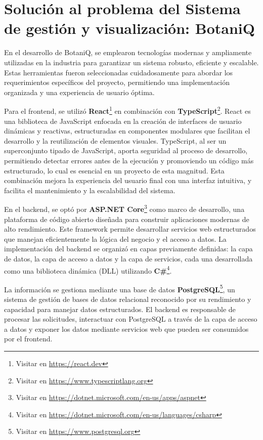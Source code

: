 \section{Solución al problema del Sistema de gestión y visualización: BotaniQ}
En el desarrollo de BotaniQ, se emplearon tecnologías modernas y ampliamente utilizadas en la industria 
para garantizar un sistema robusto, eficiente y escalable. Estas herramientas fueron seleccionadas 
cuidadosamente para abordar los requerimientos específicos del proyecto, permitiendo una implementación 
organizada y una experiencia de usuario óptima.

Para el frontend, se utilizó 
\textbf{React}\footnote{Visitar en \url{https://react.dev}}
en combinación con 
\textbf{TypeScript}\footnote{Visitar en \url{https://www.typescriptlang.org}}. 
React es una biblioteca de JavaScript enfocada en la creación de interfaces de usuario dinámicas y reactivas, estructuradas en componentes 
modulares que facilitan el desarrollo y la reutilización de elementos visuales. TypeScript, al ser un 
superconjunto tipado de JavaScript, aporta seguridad al proceso de desarrollo, permitiendo detectar 
errores antes de la ejecución y promoviendo un código más estructurado, lo cual es esencial en un 
proyecto de esta magnitud. Esta combinación mejora la experiencia del usuario final con una 
interfaz intuitiva, y facilita el mantenimiento y la escalabilidad del sistema.

En el backend, se optó por 
\textbf{ASP.NET Core}\footnote{Visitar en \url{https://dotnet.microsoft.com/en-us/apps/aspnet}}
como marco de desarrollo, una plataforma de código abierto diseñada para construir aplicaciones modernas 
de alto rendimiento. Este framework permite desarrollar servicios web estructurados que manejan eficientemente la lógica 
del negocio y el acceso a datos. 
La implementación del backend se organizó en capas previamente definidas: la capa de datos, la capa de acceso a datos y 
la capa de servicios, cada una desarrollada como una biblioteca dinámica (DLL) utilizando
\textbf{C\#}\footnote{Visitar en \url{https://dotnet.microsoft.com/en-us/languages/csharp}}.

La información se gestiona mediante una base de datos 
\textbf{PostgreSQL}\footnote{Visitar en \url{https://www.postgresql.org}}, 
un sistema de gestión de bases de datos relacional reconocido por su rendimiento y capacidad para manejar datos estructurados. 
El backend es responsable de procesar las solicitudes, interactuar con PostgreSQL a través de la capa de acceso a datos y exponer 
los datos mediante servicios web que pueden ser consumidos por el frontend.

